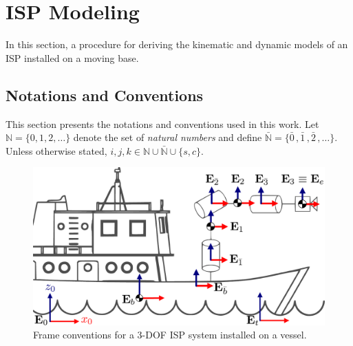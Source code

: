 \section{ISP Modeling}
\label{sec:modeling}

In this section, a procedure for deriving the kinematic and dynamic models of an ISP installed on a moving base. 

\subsection{Notations and Conventions}
\label{sec:definitions}

This section presents the notations and conventions used in this work. Let $\mathbb{N} = \{0,1,2,\dots\}$ denote the set of \textit{natural numbers} and define $\mathbb{\bar{N}} = \{ \bar{0}\,,\bar{1}\,, \bar{2}\,, \hdots \}$. Unless otherwise stated, $i, j, k \in \mathbb{N} \cup \mathbb{\bar{N}} \cup \{s,c\}$.
%
\begin{figure}[ht]
    \centering
    \includegraphics[width=1\columnwidth]{figs/ship_conventions.pdf}
    \caption{Frame conventions for a 3-DOF ISP system installed on a vessel.}
    \label{fig:HEADS_convention}
\end{figure}

